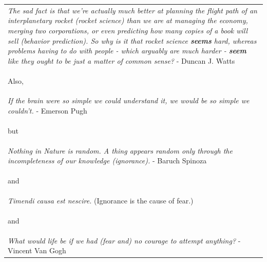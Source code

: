 \documentclass[hidelinks,11pt,a4paper]{report}
\begin{document}


\setcounter{page}{1}





\begin{table}[]
    \centering
    \begin{tabularx}{1\textwidth}{X}
        

        \textit{The sad fact is that we're actually much better at planning the flight path of an interplanetary rocket (rocket science) than we are at managing the economy, merging two corporations, or even predicting how many copies of a book will sell (behavior prediction). So why is it that rocket science \textbf{seems} hard, whereas problems having to do with people - which arguably are much harder - \textbf{seem} like they ought to be just a matter of common sense?} - Duncan J. Watts\\

        \begin{center}
                Also,
        \end{center}\\
        
        \textit{If the brain were so simple we could understand it, we would be so simple we couldn't.} - Emerson Pugh\\
        
        \begin{center}
            but
        \end{center}\\
        
        \textit{Nothing in Nature is random. A thing appears random only through the incompleteness of our knowledge (ignorance).} - Baruch Spinoza\\

        \begin{center}
                and
        \end{center}\\
        
        \textit{Timendi causa est nescire.} (Ignorance is the cause of fear.)\\
        
        \begin{center}
                and
        \end{center}\\
        
        \textit{What would life be if we had (fear and) no courage to attempt anything?} - Vincent Van Gogh\\
        
    \end{tabularx}
    
\end{table}
\end{document}
